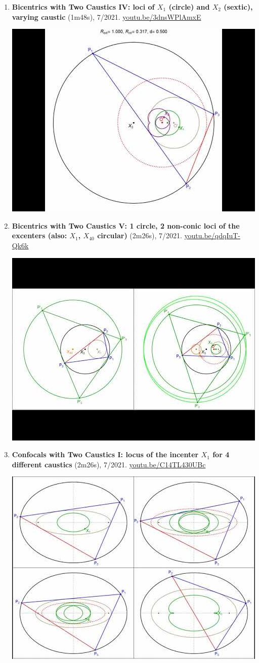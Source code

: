 \documentclass[12pt]{article}
\begin{document}
\begin{enumerate}[resume]
% 
\item \textbf{Bicentrics with Two Caustics IV: loci of $X_{1}$ (circle) and $X_{2}$ (sextic), varying caustic} (1m48s), 7/2021. \href{https://youtu.be/3dnsWPlAmxE}{\url{youtu.be/3dnsWPlAmxE}}
\begin{center}\includegraphics[width=.5\textwidth]{pics/3dnsWPlAmxE.jpg}\end{center}
% 
\item \textbf{Bicentrics with Two Caustics V: 1 circle, 2 non-conic loci of the excenters (also: $X_{1}$, $X_{40}$ circular)} (2m26s), 7/2021. \href{https://youtu.be/qdqIuT-Qk6k}{\url{youtu.be/qdqIuT-Qk6k}}
\begin{center}\includegraphics[width=.5\textwidth]{pics/qdqIuT-Qk6k.jpg}\end{center}
% 
\item \textbf{Confocals with Two Caustics I: locus of the incenter $X_{1}$ for 4 different caustics} (2m26s), 7/2021. \href{https://youtu.be/C14TL430UBc}{\url{youtu.be/C14TL430UBc}}
\begin{center}\includegraphics[width=.5\textwidth]{pics/C14TL430UBc.jpg}\end{center}

\end{enumerate}
\end{document}
